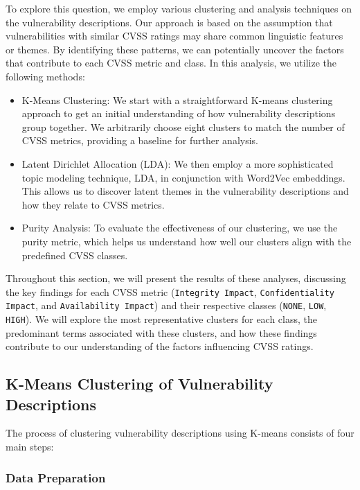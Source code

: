 To explore this question, we employ various clustering and analysis techniques on the vulnerability descriptions. Our approach is based on the assumption that vulnerabilities with similar CVSS ratings may share common linguistic features or themes. By identifying these patterns, we can potentially uncover the factors that contribute to each CVSS metric and class. In this analysis, we utilize the following methods:

\begin{itemize}

	\item	K-Means Clustering: We start with a straightforward K-means clustering approach to get an initial understanding of how vulnerability descriptions group together. We arbitrarily choose eight clusters to match the number of CVSS metrics, providing a baseline for further analysis.
	\item Latent Dirichlet Allocation (LDA): We then employ a more sophisticated topic modeling technique, LDA, in conjunction with Word2Vec embeddings. This allows us to discover latent themes in the vulnerability descriptions and how they relate to CVSS metrics.
	\item Purity Analysis: To evaluate the effectiveness of our clustering, we use the purity metric, which helps us understand how well our clusters align with the predefined CVSS classes.
\end{itemize}

Throughout this section, we will present the results of these analyses, discussing the key findings for each CVSS metric (\texttt{Integrity Impact}, \texttt{Confidentiality Impact}, and \texttt{Availability Impact}) and their respective classes (\texttt{NONE}, \texttt{LOW}, \texttt{HIGH}). We will explore the most representative clusters for each class, the predominant terms associated with these clusters, and how these findings contribute to our understanding of the factors influencing CVSS ratings.

\subsection{K-Means Clustering of Vulnerability Descriptions}

The process of clustering vulnerability descriptions using K-means consists of four main steps:

\subsubsection{Data Preparation}

